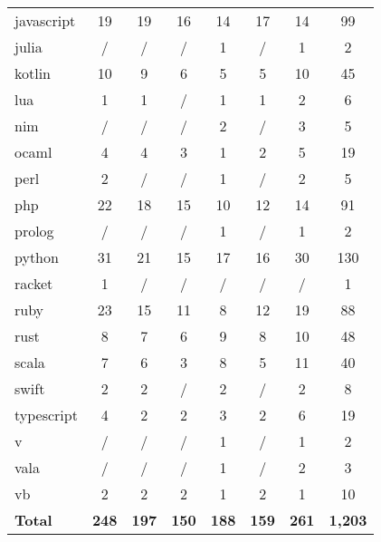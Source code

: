 \begin{table*}
\begin{tabular}{l|c|c|c|c|c|c|c}
        javascript  & 19      & 19      & 16      & 14        & 17      & 14      & 99        \\
        julia       & /       & /       & /       & 1         & /       & 1       & 2         \\
        kotlin      & 10      & 9       & 6       & 5         & 5       & 10      & 45        \\
        lua         & 1       & 1       & /       & 1         & 1       & 2       & 6         \\
        nim         & /       & /       & /       & 2         & /       & 3       & 5         \\
        ocaml       & 4       & 4       & 3       & 1         & 2       & 5       & 19        \\
        perl        & 2       & /       & /       & 1         & /       & 2       & 5         \\
        php         & 22      & 18      & 15      & 10        & 12      & 14      & 91        \\
        prolog      & /       & /       & /       & 1         & /       & 1       & 2         \\
        python      & 31      & 21      & 15      & 17        & 16      & 30      & 130       \\
        racket      & 1       & /       & /       & /         & /       & /       & 1         \\
        ruby        & 23      & 15      & 11      & 8         & 12      & 19      & 88        \\
        rust        & 8       & 7       & 6       & 9         & 8       & 10      & 48        \\
        scala       & 7       & 6       & 3       & 8         & 5       & 11      & 40        \\
        swift       & 2       & 2       & /       & 2         & /       & 2       & 8         \\
        typescript  & 4       & 2       & 2       & 3         & 2       & 6       & 19        \\
        v           & /       & /       & /       & 1         & /       & 1       & 2         \\
        vala        & /       & /       & /       & 1         & /       & 2       & 3         \\
        vb          & 2       & 2       & 2       & 1         & 2       & 1       & 10        \\
        \midrule
        \bf Total   & \bf 248 & \bf 197 & \bf 150 & \bf 188   & \bf 159 & \bf 261 & \bf 1,203 \\
        \bottomrule
    \end{tabular}
\end{table*}